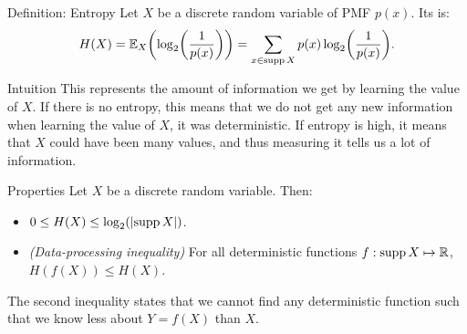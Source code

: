 \documentclass[a4paper]{article}
\begin{document}
\begin{parag}{Definition: Entropy}
    Let $X$ be a discrete random variable of PMF $p\left(x\right)$. Its  is: 
    \[H\left(X\right) = \exval_X\left(\log_2\left(\frac{1}{p\left(x\right)}\right)\right) = \sum_{x \in \supp X} p\left(x\right) \log_2\left(\frac{1}{p\left(x\right)}\right).\]

    \begin{subparag}{Intuition}
        This represents the amount of information we get by learning the value of $X$. If there is no entropy, this means that we do not get any new information when learning the value of $X$, it was deterministic. If entropy is high, it means that $X$ could have been many values, and thus measuring it tells us a lot of information.
    \end{subparag}

    \begin{subparag}{Properties}
        Let $X$ be a discrete random variable. Then:
        \begin{itemize}
            \item $0 \leq H\left(X\right) \leq \log_2\left(\left|\supp X\right|\right)$.
            \item \textit{(Data-processing inequality)} For all deterministic functions $f: \operatorname{supp} X \mapsto \mathbb{R}$, $H\left(f\left(X\right)\right) \leq H\left(X\right)$.
        \end{itemize}
        
        The second inequality states that we cannot find any deterministic function such that we know less about $Y = f\left(X\right)$ than $X$.
    \end{subparag}
\end{parag}
\end{document}
